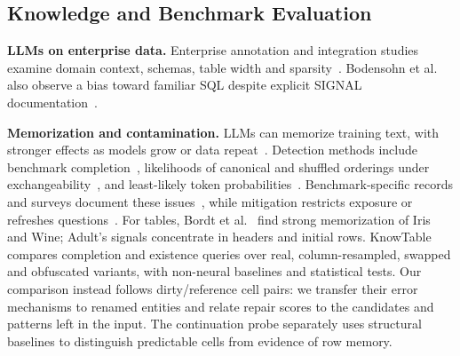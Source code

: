 \documentclass[sigconf, nonacm]{acmart}
\begin{document}
\begingroup
\makeatletter
{}
\makeatother
\subsection{Knowledge and Benchmark Evaluation}\label{sec:relatedwork}

\textbf{LLMs on enterprise data.} Enterprise annotation and integration studies examine domain
context, schemas, table width and sparsity~\cite{kayali_cidr25,demiralp2024enterprise}.
Bodensohn et al. also observe a bias toward familiar SQL despite explicit SIGNAL
documentation~\cite{bodensohn2025enterprise}.
\par
\endgroup

\textbf{Memorization and contamination.} LLMs can memorize training text, with stronger effects
as models grow or data repeat~\cite{274574,carlini2023quantifying}. Detection methods include
benchmark completion~\cite{ICLR2024_bc39a59c}, likelihoods of canonical and shuffled orderings
under exchangeability~\cite{oren2024proving}, and least-likely token
probabilities~\cite{shi2024detecting}. Benchmark-specific records and surveys document these
issues~\cite{sainz2023trouble,xu2024contamination}, while mitigation restricts exposure or
refreshes questions~\cite{jacovi2023stop,white2025livebench}.
For tables, Bordt et al.~\cite{bordt2024elephants} find strong memorization of Iris and Wine;
Adult's signals concentrate in headers and initial rows. KnowTable~\cite{silvestri2025knowtable}
compares completion and existence queries over real, column-resampled, swapped and obfuscated
variants, with non-neural baselines and statistical tests. Our comparison instead follows
dirty/reference cell pairs: we transfer their error mechanisms to renamed entities and relate
repair scores to the candidates and patterns left in the input. The continuation probe separately
uses structural baselines to distinguish predictable cells from evidence of row memory.
\end{document}
